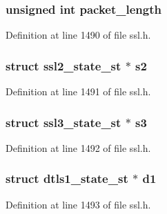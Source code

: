 \subsubsection[{\texorpdfstring{packet\+\_\+length}{packet_length}}]{\setlength{\rightskip}{0pt plus 5cm}unsigned int packet\+\_\+length}\hypertarget{structssl__st_adeb7e6beb692f86e02431fbd430d92a1}{}\label{structssl__st_adeb7e6beb692f86e02431fbd430d92a1}


Definition at line 1490 of file ssl.\+h.

\subsubsection[{\texorpdfstring{s2}{s2}}]{\setlength{\rightskip}{0pt plus 5cm}struct {\bf ssl2\+\_\+state\+\_\+st} $\ast$ s2}\hypertarget{structssl__st_a9e36170ed395e2d8b11e8aab8e0f7750}{}\label{structssl__st_a9e36170ed395e2d8b11e8aab8e0f7750}


Definition at line 1491 of file ssl.\+h.

\subsubsection[{\texorpdfstring{s3}{s3}}]{\setlength{\rightskip}{0pt plus 5cm}struct {\bf ssl3\+\_\+state\+\_\+st} $\ast$ s3}\hypertarget{structssl__st_afa0c35c6a2732cc101c6a795213cbb70}{}\label{structssl__st_afa0c35c6a2732cc101c6a795213cbb70}


Definition at line 1492 of file ssl.\+h.

\subsubsection[{\texorpdfstring{d1}{d1}}]{\setlength{\rightskip}{0pt plus 5cm}struct {\bf dtls1\+\_\+state\+\_\+st} $\ast$ d1}\hypertarget{structssl__st_a0eff85c9ff070b3b230b4b049b185850}{}\label{structssl__st_a0eff85c9ff070b3b230b4b049b185850}


Definition at line 1493 of file ssl.\+h.

